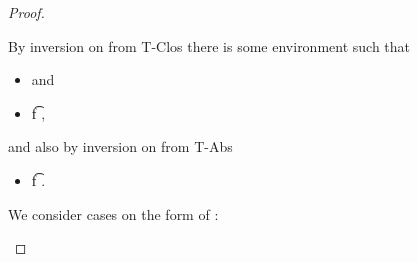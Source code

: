 \begin{lemma}
\begin{proof}
\begin{case}[T-App]
\begin{itemize}
\begin{subcase}[B-BetaClosure]
         By inversion on  from T-Clos
         there is some environment {\propenvc{}} such that
         \begin{itemize}
           \item
               and
            \item
  \judgement {\propenvc{}} { {\ArrowOne {\x{}} {\s{}}
                                                       {\t{f}}
                                                       {
                                                                   {}}
                                                       {}}}
                {
                            {}}
                {},
         \end{itemize}
         and also by inversion on  from T-Abs
         \begin{itemize}
           \item
  { \judgement {\propenvc{}, {\isprop {\s{}} {\x{}}}}
              { {\t{f}}}
               {
                           {}}
               {}}.
         \end{itemize}

         We consider cases on the form of :


\end{subcase}
\end{itemize}
\end{case}
\end{proof}
\end{lemma}
